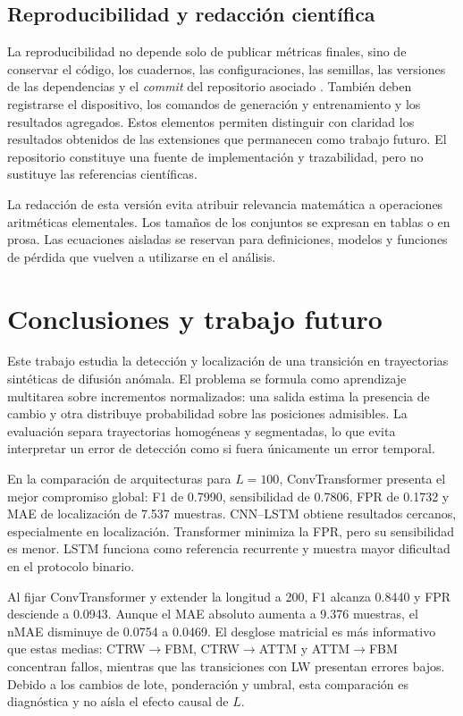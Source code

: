 \documentclass[a4paper,12pt]{article}
\begin{document}
\subsection{Reproducibilidad y redacción científica}

La reproducibilidad no depende solo de publicar métricas finales, sino de conservar el código, los cuadernos, las configuraciones, las semillas, las versiones de las dependencias y el \emph{commit} del repositorio asociado \cite{chair2026repo}. También deben registrarse el dispositivo, los comandos de generación y entrenamiento y los resultados agregados. Estos elementos permiten distinguir con claridad los resultados obtenidos de las extensiones que permanecen como trabajo futuro. El repositorio constituye una fuente de implementación y trazabilidad, pero no sustituye las referencias científicas.

La redacción de esta versión evita atribuir relevancia matemática a operaciones aritméticas elementales. Los tamaños de los conjuntos se expresan en tablas o en prosa. Las ecuaciones aisladas se reservan para definiciones, modelos y funciones de pérdida que vuelven a utilizarse en el análisis.

\section{Conclusiones y trabajo futuro}

Este trabajo estudia la detección y localización de una transición en trayectorias sintéticas de difusión anómala. El problema se formula como aprendizaje multitarea sobre incrementos normalizados: una salida estima la presencia de cambio y otra distribuye probabilidad sobre las posiciones admisibles. La evaluación separa trayectorias homogéneas y segmentadas, lo que evita interpretar un error de detección como si fuera únicamente un error temporal.

En la comparación de arquitecturas para $L=100$, ConvTransformer presenta el mejor compromiso global: F1 de 0.7990, sensibilidad de 0.7806, FPR de 0.1732 y MAE de localización de 7.537 muestras. CNN--LSTM obtiene resultados cercanos, especialmente en localización. Transformer minimiza la FPR, pero su sensibilidad es menor. LSTM funciona como referencia recurrente y muestra mayor dificultad en el protocolo binario.

Al fijar ConvTransformer y extender la longitud a 200, F1 alcanza 0.8440 y FPR desciende a 0.0943. Aunque el MAE absoluto aumenta a 9.376 muestras, el nMAE disminuye de 0.0754 a 0.0469. El desglose matricial es más informativo que estas medias: CTRW$\to$FBM, CTRW$\to$ATTM y ATTM$\to$FBM concentran fallos, mientras que las transiciones con LW presentan errores bajos. Debido a los cambios de lote, ponderación y umbral, esta comparación es diagnóstica y no aísla el efecto causal de $L$.
\end{document}
